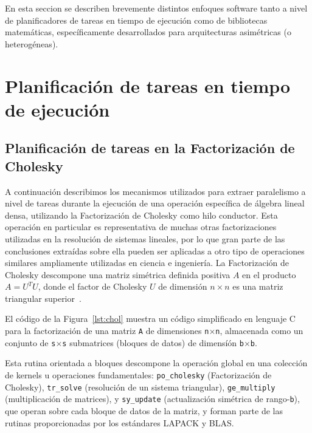 En esta seccion se describen brevemente distintos enfoques software tanto a nivel de planificadores de tareas
en tiempo de ejecución como de bibliotecas matemáticas, específicamente desarrollados para arquitecturas 
asimétricas (o heterogéneas).

\section{Planificación de tareas en tiempo de ejecución}

\subsection{Planificación de tareas en la Factorización de Cholesky}

A continuación describimos los mecanismos utilizados para extraer paralelismo a nivel de tareas
durante la ejecución de una operación específica de álgebra lineal densa, utilizando la Factorización
de Cholesky como hilo conductor. Esta operación en particular es representativa de muchas
otras factorizaciones utilizadas en la resolución de sistemas lineales, por lo que gran parte de las
conclusiones extraídas sobre ella pueden ser aplicadas a otro tipo de operaciones similares ampliamente
utilizadas en ciencia e ingeniería.
%
La Factorización de Cholesky descompone una matriz simétrica definida positiva
$A$ en el producto $A=U^TU$, donde el factor de Cholesky $U$ de dimensión $n \times n$ es una matriz triangular
superior~\cite{GVL3}. 



El código de la Figura~\ref{lst:chol} muestra un código simplificado en lenguaje C para
la factorización de una matriz {\tt A} de dimensiones {\tt n}$\times${\tt n}, 
almacenada como un conjunto de {\tt s}$\times${\tt s} submatrices (bloques de datos) de dimensíón 
{\tt b}$\times${\tt b}.

Esta rutina orientada a bloques descompone la operación global en una colección de kernels u operaciones
fundamentales:
{\tt po\_cholesky} (Factorización de Cholesky), {\tt tr\_solve} (resolución de un sistema triangular),
{\tt ge\_multiply} (multiplicación de matrices), y 
{\tt sy\_update} (actualización simétrica de rango-{\tt b}), que operan sobre cada bloque
de datos de la matriz, y forman parte de las rutinas proporcionadas por los estándares LAPACK y BLAS. 

